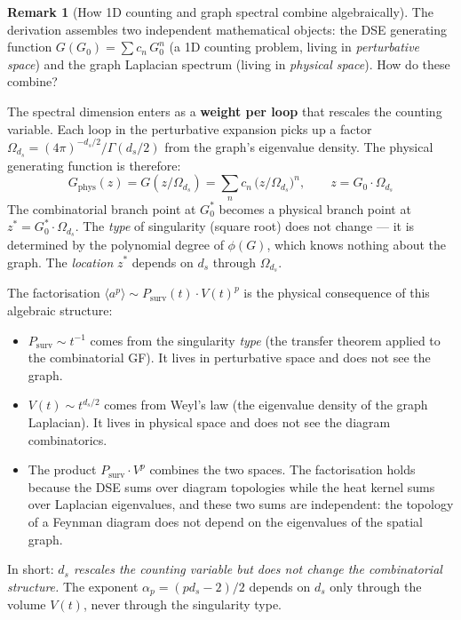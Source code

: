 \documentclass[11pt,a4paper]{article}
\theoremstyle{definition}
\newtheorem*{remark}{Remark}
\newcommand{\Psurv}{P_{\mathrm{surv}}}
\begin{document}
\begin{remark}[How 1D counting and graph spectral combine algebraically]
\label{rem:combination}
The derivation assembles two independent mathematical objects: the DSE
generating function $G(G_0) = \sum c_n\, G_0^n$ (a 1D counting problem,
living in \emph{perturbative space}) and the graph Laplacian spectrum
(living in \emph{physical space}). How do these combine?

The spectral dimension enters as a \textbf{weight per loop} that rescales
the counting variable. Each loop in the perturbative expansion picks up a
factor $\Omega_{d_s} = (4\pi)^{-d_s/2}/\Gamma(d_s/2)$ from the graph's
eigenvalue density. The physical generating function is therefore:
\begin{equation}
G_{\mathrm{phys}}(z) = G(z/\Omega_{d_s}) = \sum_n c_n\,
\bigl(z / \Omega_{d_s}\bigr)^n,
\qquad z = G_0 \cdot \Omega_{d_s}
\end{equation}
The combinatorial branch point at $G_0^*$ becomes a physical branch
point at $z^* = G_0^* \cdot \Omega_{d_s}$. The \emph{type} of
singularity (square root) does not change --- it is determined by the
polynomial degree of $\phi(G)$, which knows nothing about the graph.
The \emph{location} $z^*$ depends on $d_s$ through $\Omega_{d_s}$.

The factorisation $\langle a^p \rangle \sim \Psurv(t) \cdot V(t)^p$ is
the physical consequence of this algebraic structure:
\begin{itemize}
\item $\Psurv \sim t^{-1}$ comes from the singularity \emph{type}
      (the transfer theorem applied to the combinatorial GF). It lives
      in perturbative space and does not see the graph.
\item $V(t) \sim t^{d_s/2}$ comes from Weyl's law (the eigenvalue
      density of the graph Laplacian). It lives in physical space and
      does not see the diagram combinatorics.
\item The product $\Psurv \cdot V^p$ combines the two spaces. The
      factorisation holds because the DSE sums over diagram topologies
      while the heat kernel sums over Laplacian eigenvalues, and these
      two sums are independent: the topology of a Feynman diagram does
      not depend on the eigenvalues of the spatial graph.
\end{itemize}
In short: \emph{$d_s$ rescales the counting variable but does not
change the combinatorial structure.} The exponent $\alpha_p = (pd_s - 2)/2$
depends on $d_s$ only through the volume $V(t)$, never through the
singularity type.
\end{remark}
\end{document}
